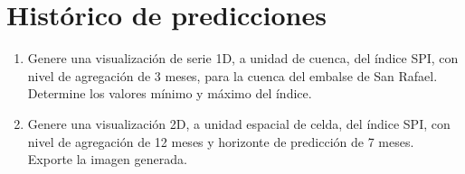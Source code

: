 \documentclass[12pt,a4paper,violet,openany]{bbe}
\begin{document}
\section{Hist\'orico de predicciones}
\begin{enumerate}[leftmargin=*,label=\alph*)]
    \item Genere una visualizaci\'on de serie 1D, a unidad de cuenca, del índice SPI, con nivel de agregaci\'on de 3 meses, para la cuenca del embalse de San Rafael. Determine los valores m\'inimo y m\'aximo del índice.
    \item Genere una visualizaci\'on 2D, a unidad espacial de celda, del índice SPI, con nivel de agregaci\'on de 12 meses y horizonte de predicci\'on de 7 meses. Exporte la imagen generada.
\end{enumerate}
\end{document}
